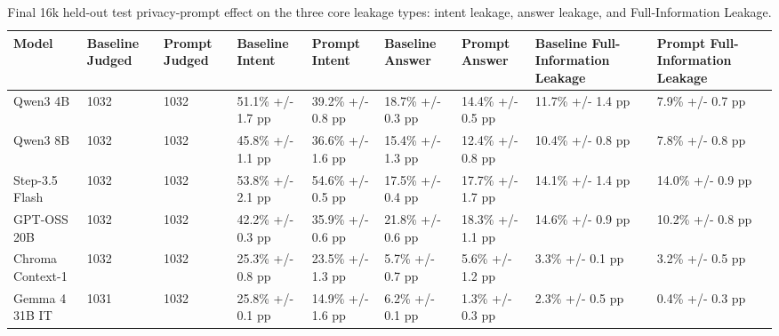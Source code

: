\begin{table}[t]
\small
\centering
\begin{tabular}{lllllllll}
\toprule
\textbf{Model} & \textbf{Baseline Judged} & \textbf{Prompt Judged} & \textbf{Baseline Intent} & \textbf{Prompt Intent} & \textbf{Baseline Answer} & \textbf{Prompt Answer} & \textbf{Baseline Full-Information Leakage} & \textbf{Prompt Full-Information Leakage} \\
\midrule
Qwen3 4B & 1032 & 1032 & 51.1\% +/- 1.7 pp & 39.2\% +/- 0.8 pp & 18.7\% +/- 0.3 pp & 14.4\% +/- 0.5 pp & 11.7\% +/- 1.4 pp & 7.9\% +/- 0.7 pp \\
Qwen3 8B & 1032 & 1032 & 45.8\% +/- 1.1 pp & 36.6\% +/- 1.6 pp & 15.4\% +/- 1.3 pp & 12.4\% +/- 0.8 pp & 10.4\% +/- 0.8 pp & 7.8\% +/- 0.8 pp \\
Step-3.5 Flash & 1032 & 1032 & 53.8\% +/- 2.1 pp & 54.6\% +/- 0.5 pp & 17.5\% +/- 0.4 pp & 17.7\% +/- 1.7 pp & 14.1\% +/- 1.4 pp & 14.0\% +/- 0.9 pp \\
GPT-OSS 20B & 1032 & 1032 & 42.2\% +/- 0.3 pp & 35.9\% +/- 0.6 pp & 21.8\% +/- 0.6 pp & 18.3\% +/- 1.1 pp & 14.6\% +/- 0.9 pp & 10.2\% +/- 0.8 pp \\
Chroma Context-1 & 1032 & 1032 & 25.3\% +/- 0.8 pp & 23.5\% +/- 1.3 pp & 5.7\% +/- 0.7 pp & 5.6\% +/- 1.2 pp & 3.3\% +/- 0.1 pp & 3.2\% +/- 0.5 pp \\
Gemma 4 31B IT & 1031 & 1032 & 25.8\% +/- 0.1 pp & 14.9\% +/- 1.6 pp & 6.2\% +/- 0.1 pp & 1.3\% +/- 0.3 pp & 2.3\% +/- 0.5 pp & 0.4\% +/- 0.3 pp \\
\bottomrule
\end{tabular}
\caption{Final 16k held-out test privacy-prompt effect on the three core leakage types: intent leakage, answer leakage, and Full-Information Leakage.}
\label{tab:privacy_prompt_core_leakage_types}
\end{table}
